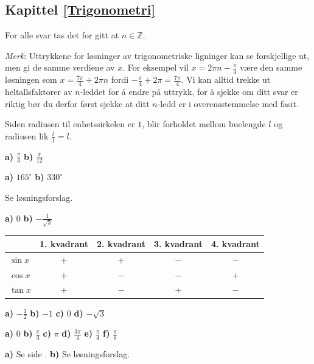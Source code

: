 




\subsection*{Kapittel \ref{Trigonometri}}	
\footnotesize
For alle svar tas det for gitt at $ n\in \mathbb{Z} $.

\textsl{Merk}: Uttrykkene for løsninger av trigonometriske ligninger kan se forskjellige ut, men gi de samme verdiene av $ x $. For eksempel vil $ {x= 2\pi n-\frac{\pi}{4}} $ være den samme løsningen som $ {x = \frac{7\pi}{4}+2\pi n} $ fordi $ {-\frac{\pi}{4}+2\pi = \frac{7\pi}{4}}$. Vi kan alltid trekke ut heltallsfaktorer av $ n $-leddet for å endre på uttrykk, for å sjekke om ditt svar er riktig bør du derfor først sjekke at ditt $ n $-ledd er i overensstemmelse med fasit.

Siden radiusen til enhetssirkelen er $ 1 $, blir forholdet mellom buelengde $ l $ og radiusen lik $ \frac{l}{1}=l $.

 \textbf{a)} $ \frac{\pi}{3} $ \textbf{b)} $ \frac{\pi}{12} $

 \textbf{a)} $ 165^\circ $ \textbf{b)} $ 330^\circ $

 Se løsningsforslag.

 \textbf{a)} $ 0  $ \textbf{b)} $- \frac{1}{\sqrt{3}} $
\newpage
{}\\
\begin{tabular}{@{}l|c| c| c|c|}
	
	&1. kvadrant & 2. kvadrant & 3. kvadrant & 4. kvadrant\\ \hline
	$ \sin x $& +& +& $ - $&$ - $\\ \hline
	$ \cos x $& +& $ - $& $ - $&+\\ \hline
	$ \tan x $& +& $ - $& +&$ - $\\\hline
\end{tabular}\vsk

\textbf{a)} $ -\frac{1}{2} $ \textbf{b)} $ -1 $ \textbf{c)} $ 0 $ \textbf{d)} $ -\sqrt{3} $

\textbf{a)} 0 \textbf{b)} $ \frac{\pi}{3} $ \textbf{c)} $ \pi $
\textbf{d)} $ \frac{3\pi}{4} $ \textbf{e)} $ \frac{\pi}{4} $ 
\textbf{f)} $ \frac{\pi}{6} $

 \selos

 \textbf{a)} Se side \pageref{sin2xbevis}. \textbf{b)} Se løsningsforslag.

